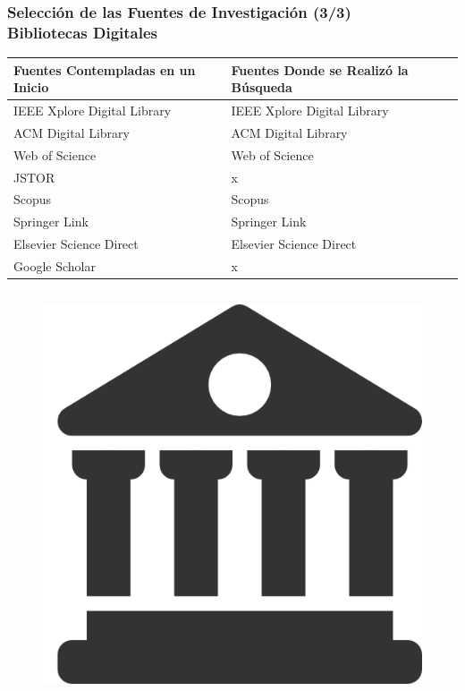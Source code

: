 \documentclass{beamer}
\begin{document}
\begin{frame}
    \frametitle{Selección de las Fuentes de Investigación (3/3)\\ Bibliotecas Digitales}
    \begin{table}
    	\begin{center}
    		\begin{tabular}{| p{5cm} | p{5cm} |}
    			\hline
    			\textbf {Fuentes Contempladas en un Inicio} &  \textbf{Fuentes Donde se Realizó la Búsqueda}\\
    			\hline
    			IEEE Xplore Digital Library & IEEE Xplore Digital Library\\
    			\hline
    			ACM Digital Library & ACM Digital Library\\
    			\hline
    			Web of Science & Web of Science\\
    			\hline
    			JSTOR & x\\
    			\hline
    			Scopus & Scopus\\
    			\hline
    			Springer Link & Springer Link\\
    			\hline
    			Elsevier Science Direct & Elsevier Science Direct\\
    			\hline
    			Google Scholar & x\\
    			\hline
    		\end{tabular}
    	\end{center}
    \end{table}
    \begin{columns}[c]
    	\begin{figure}
    		\begin{center}
    			\includegraphics[scale=1.2]{images/2icons/library.png}

\end{center}
\end{figure}
\end{columns}
\end{frame}
\end{document}
